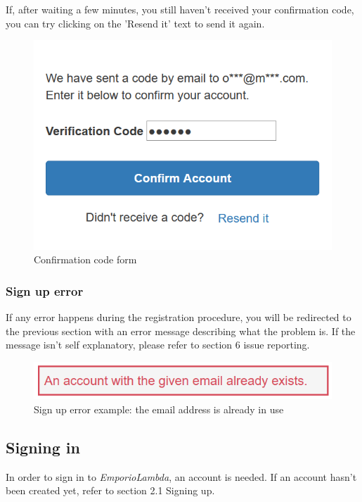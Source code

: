 If, after waiting a few minutes, you still haven't received your confirmation code, you can try clicking on the 'Resend it' text to send it again.

\begin{figure}[H]
\centering
\includegraphics[scale=0.6]{res/Immagini/RegisterCode}
\caption{Confirmation code form}
\end{figure}

\subsubsection{Sign up error}
If any error happens during the registration procedure, you will be redirected to the previous section with an error message describing what the problem is. If the message isn't self explanatory, please refer to section 6 issue reporting.

\begin{figure}[H]
\centering
\includegraphics[scale=0.6]{res/Immagini/RegisterError}
\caption{Sign up error example: the email address is already in use}
\end{figure}

\subsection{Signing in}
In order to sign in to \textit{EmporioLambda}, an account is needed. If an account hasn't been created yet, refer to section 2.1 Signing up.


